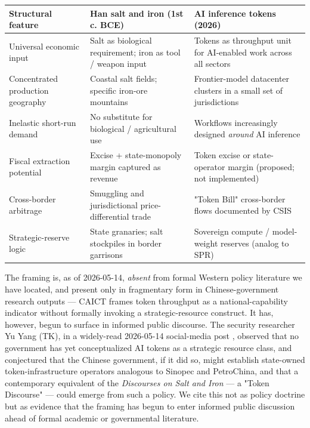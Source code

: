 \documentclass[11pt,a4paper]{article}
\begin{document}
\begin{center}
\begin{tabular}{lll}
\toprule
Structural feature & Han salt and iron (1st c. BCE) & AI inference tokens (2026) \\
\midrule
Universal economic input & Salt as biological requirement; iron as tool / weapon input & Tokens as throughput unit for AI-enabled work across all sectors \\
Concentrated production geography & Coastal salt fields; specific iron-ore mountains & Frontier-model datacenter clusters in a small set of jurisdictions \\
Inelastic short-run demand & No substitute for biological / agricultural use & Workflows increasingly designed \emph{around} AI inference \\
Fiscal extraction potential & Excise + state-monopoly margin captured as revenue & Token excise or state-operator margin (proposed; not implemented) \\
Cross-border arbitrage & Smuggling and jurisdictional price-differential trade & "Token Bill" cross-border flows documented by CSIS \cite{csis2026tokenbill} \\
Strategic-reserve logic & State granaries; salt stockpiles in border garrisons & Sovereign compute / model-weight reserves (analog to SPR) \\
\bottomrule
\end{tabular}
\end{center}


The framing is, as of 2026-05-14, \emph{absent} from formal Western policy literature we have located, and present only in fragmentary form in Chinese-government research outputs --- CAICT \cite{caict2026ai} frames token throughput as a national-capability indicator without formally invoking a strategic-resource construct. It has, however, begun to surface in informed public discourse. The security researcher Yu Yang (TK), in a widely-read 2026-05-14 social-media post \cite{yu2026sovereigntoken}, observed that no government has yet conceptualized AI tokens as a strategic resource class, and conjectured that the Chinese government, if it did so, might establish state-owned token-infrastructure operators analogous to Sinopec and PetroChina, and that a contemporary equivalent of the \emph{Discourses on Salt and Iron} --- a "Token Discourse" --- could emerge from such a policy. We cite this not as policy doctrine but as evidence that the framing has begun to enter informed public discussion ahead of formal academic or governmental literature.
\end{document}
